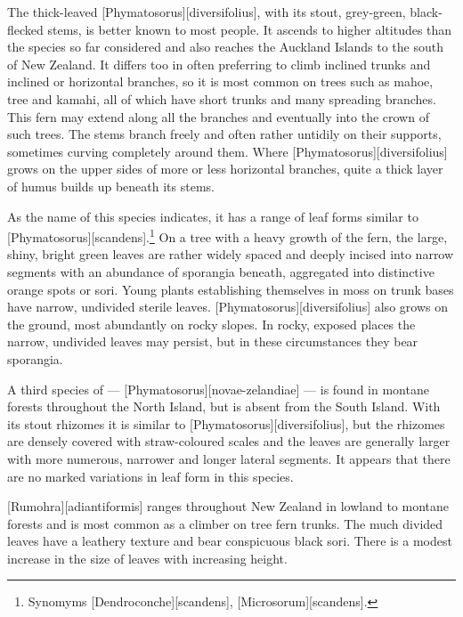 The thick-leaved [Phymatosorus][diversifolius], with its stout, grey-green, black-flecked stems, is better known to most people.
It ascends to higher altitudes than the species so far considered and also reaches the Auckland Islands to the south of New Zealand.
It differs too in often preferring to climb inclined trunks and inclined or horizontal branches, so it is most common on trees such as mahoe, tree  and kamahi, all of which have short trunks and many spreading branches.
This fern may extend along all the branches and eventually into the crown of such trees.
The stems branch freely and often rather untidily on their supports, sometimes curving completely around them.
Where [Phymatosorus][diversifolius] grows on the upper sides of more or less horizontal branches, quite a thick layer of humus builds up beneath its stems.

As the name of this species indicates, it has a range of leaf forms similar to [Phymatosorus][scandens].\footnote{Synomyms [Dendroconche][scandens], [Microsorum][scandens].}
On a tree with a heavy growth of the fern, the large, shiny, bright green leaves are rather widely spaced and deeply incised into narrow segments with an abundance of sporangia beneath, aggregated into distinctive orange spots or sori.
Young plants establishing themselves in moss on trunk bases have narrow, undivided sterile leaves. [Phymatosorus][diversifolius] also grows on the ground, most abundantly on rocky slopes.
In rocky, exposed places the narrow, undivided leaves may persist, but in these circumstances they bear sporangia.

A third species of  --- [Phymatosorus][novae-zelandiae] --- is found in montane forests throughout the North Island, but is absent from the South Island.
With its stout rhizomes it is similar to [Phymatosorus][diversifolius], but the rhizomes are densely covered with straw-coloured scales and the leaves are generally larger with more numerous, narrower and longer lateral segments.
It appears that there are no marked variations in leaf form in this species.

[Rumohra][adiantiformis] ranges throughout New Zealand in lowland to montane forests and is most common as a climber on tree fern trunks.
The much divided leaves have a leathery texture and bear conspicuous black sori.
There is a modest increase in the size of leaves with increasing height.

